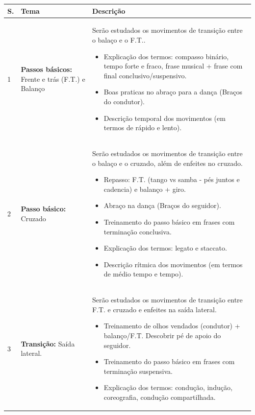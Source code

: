 \documentclass[12pt, a4paper]{article}
\begin{document}
\begin{table}[h]
\centering
\begin{tabular}{|p{0.5cm}|p{3.0cm}|p{12.0cm}|}
\hline
S. & Tema & Descrição \\  \hline \hline
1 &  \textbf{Passos básicos:} Frente e trás (F.T.) e Balanço & Serão estudados os movimentos de transição entre o balaço e o F.T.. 
        \begin{itemize}
        \item Explicação dos termos: compasso binário, tempo forte e fraco, frase musical + frase com final conclusivo/suspensivo.
        \item Boas praticas no abraço para a dança (Braços do condutor). 
        \item Descrição temporal dos movimentos (em termos de rápido e lento).
        \end{itemize}
        \\ \hline
2 &  \textbf{Passo básico:} Cruzado &  Serão estudados os movimentos de transição entre o balaço e o cruzado, além de enfeites no cruzado. 
        \begin{itemize}
        \item Repasso: F.T. (tango vs samba - pés juntos e cadencia) e balanço + giro. 
        \item Abraço na dança (Braços do seguidor).
        \item Treinamento do passo básico em frases com terminação conclusiva. 
        \item Explicação dos termos: legato e staccato.
        \item Descrição rítmica dos movimentos (em termos de médio tempo e tempo).
        \end{itemize}
        \\ \hline
3 &  \textbf{Transição:} Saída lateral. &  Serão estudados os movimentos de transição entre F.T. e cruzado e enfeites na saída lateral. 
        \begin{itemize}
        \item Treinamento de olhos vendados (condutor) + balanço/F.T. Descobrir pé de apoio do seguidor.
        \item Treinamento do passo básico em frases com terminação suspensiva. 
        \item Explicação dos termos: condução, indução, coreografia, condução compartilhada.

\end{itemize}
\end{tabular}
\end{table}
\end{document}
